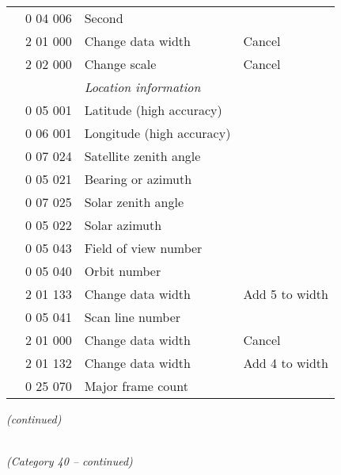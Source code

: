 \begin{longtable}[]{@{}llll@{}}
& 0 04 006 & Second &\tabularnewline
& 2 01 000 & Change data width & Cancel\tabularnewline
& 2 02 000 & Change scale & Cancel\tabularnewline
& & \emph{Location information} &\tabularnewline
& 0 05 001 & Latitude (high accuracy) &\tabularnewline
& 0 06 001 & Longitude (high accuracy) &\tabularnewline
& 0 07 024 & Satellite zenith angle &\tabularnewline
& 0 05 021 & Bearing or azimuth &\tabularnewline
& 0 07 025 & Solar zenith angle &\tabularnewline
& 0 05 022 & Solar azimuth &\tabularnewline
& 0 05 043 & Field of view number &\tabularnewline
& 0 05 040 & Orbit number &\tabularnewline
& 2 01 133 & Change data width & Add 5 to width\tabularnewline
& 0 05 041 & Scan line number &\tabularnewline
& 2 01 000 & Change data width & Cancel\tabularnewline
& 2 01 132 & Change data width & Add 4 to width\tabularnewline
& 0 25 070 & Major frame count &\tabularnewline
\bottomrule
\end{longtable}

\emph{(continued)}

\emph{\\
(Category 40 -- continued)}

